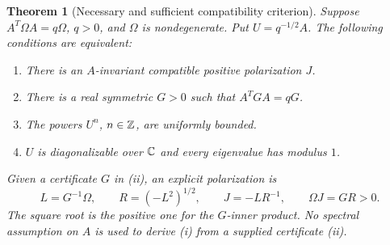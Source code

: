 \documentclass[11pt,a4paper]{article}
\newtheorem{theorem}[definition]{Theorem}
\theoremstyle{remark}\newtheorem{remark}[definition]{Remark}
\begin{document}
\begin{theorem}[Necessary and sufficient compatibility criterion]\label{thm:polarization}
Suppose $A^T\Omega A=q\Omega$, $q>0$, and $\Omega$ is nondegenerate. Put $U=q^{-1/2}A$. The following conditions are equivalent:
\begin{enumerate}[label=(\roman*)]
\item There is an $A$-invariant compatible positive polarization $J$.
\item There is a real symmetric $G>0$ such that $A^TGA=qG$.
\item The powers $U^n$, $n\in\mathbb Z$, are uniformly bounded.
\item $U$ is diagonalizable over $\mathbb C$ and every eigenvalue has modulus $1$.
\end{enumerate}
Given a certificate $G$ in (ii), an explicit polarization is
\[
L=G^{-1}\Omega,\qquad R=(-L^2)^{1/2},\qquad J=-LR^{-1},
\qquad \Omega J=GR>0.
\tag{5.1}\label{eq:J}
\]
The square root is the positive one for the $G$-inner product. No spectral assumption on $A$ is used to derive (i) from a supplied certificate (ii).
\end{theorem}
\end{document}

